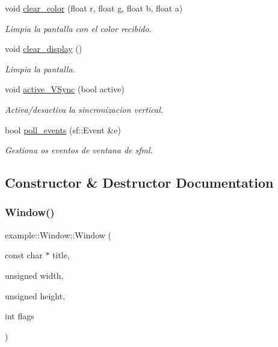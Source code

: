 \begin{DoxyCompactItemize}
void \mbox{\hyperlink{classexample_1_1_window_ae3c35c4dc60fc4fe3fc4828fcbf95ecd}{clear\+\_\+color}} (float r, float g, float b, float a)
\begin{DoxyCompactList}\small\item\em Limpia la pantalla con el color recibido. \end{DoxyCompactList}\item 
void \mbox{\hyperlink{classexample_1_1_window_acb15170727291416c3a3ea19afa1b729}{clear\+\_\+display}} ()
\begin{DoxyCompactList}\small\item\em Limpia la pantalla. \end{DoxyCompactList}\item 
void \mbox{\hyperlink{classexample_1_1_window_a1d967d9de886bf8e0ab1432d8030d761}{active\+\_\+\+V\+Sync}} (bool active)
\begin{DoxyCompactList}\small\item\em Activa/desactiva la sincronizacion vertical. \end{DoxyCompactList}\item 
bool \mbox{\hyperlink{classexample_1_1_window_abebfb01402035477a536d3fae1bed660}{poll\+\_\+events}} (sf\+::\+Event \&e)
\begin{DoxyCompactList}\small\item\em Gestiona os eventos de ventana de sfml. \end{DoxyCompactList}\end{DoxyCompactItemize}


\subsection{Constructor \& Destructor Documentation}
\mbox{\label{classexample_1_1_window_a144eb8c2ca14e51d35ba18bc37f2eb56}} 
\subsubsection{\texorpdfstring{Window()}{Window()}}
{\footnotesize\ttfamily example\+::\+Window\+::\+Window (\begin{DoxyParamCaption}\item[{const char $\ast$}]{title,  }\item[{unsigned}]{width,  }\item[{unsigned}]{height,  }\item[{int}]{flags }\end{DoxyParamCaption})}



